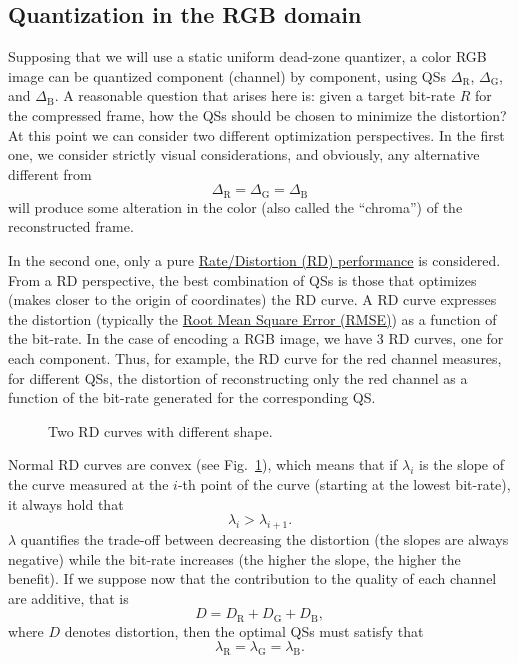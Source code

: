 \subsection{Quantization in the RGB domain}
Supposing that we will use a static uniform dead-zone quantizer, a
color RGB image can be quantized component (channel) by component,
using QSs $\Delta_{\text{R}}$, $\Delta_{\text{G}}$, and
$\Delta_{\text{B}}$. A reasonable question that arises here is: given
a target bit-rate $R$ for the compressed frame, how the QSs should be
chosen to minimize the distortion?  At this point we can consider two
different optimization perspectives. In the first one, we consider
strictly visual considerations, and obviously, any alternative
different from
\begin{equation}
  \Delta_{\text{R}} = \Delta_{\text{G}} = \Delta_{\text{B}}
  \label{eq:simple_Q}
\end{equation}
will produce some alteration in the color (also called the
``chroma'') of the reconstructed frame.

In the second one, only a pure
\href{https://en.wikipedia.org/wiki/Rate-distortion_theory}{Rate/Distortion
  (RD) performance} is considered. From a RD perspective, the best
combination of QSs is those that optimizes (makes closer to the origin
of coordinates) the RD curve. A RD curve expresses the distortion
(typically the
\href{https://en.wikipedia.org/wiki/Root-mean-square_deviation}{Root
  Mean Square Error (RMSE)}) as a function of the bit-rate. In the
case of encoding a RGB image, we have 3 RD curves, one for each
component. Thus, for example, the RD curve for the red channel measures,
for different QSs, the distortion of reconstructing only the red
channel as a function of the bit-rate generated for the corresponding
QS.

\begin{figure}
  \centering
  \caption{Two RD curves with different shape.}
  \label{fig:RD_slopes}
\end{figure}

Normal RD curves are convex (see Fig.~\ref{fig:RD_slopes}), which
means that if $\lambda_i$ is the slope of the curve measured at the
$i$-th point of the curve (starting at the lowest bit-rate), it always
hold that
\begin{equation}
  \lambda_i > \lambda_{i+1}.
\end{equation}
$\lambda$ quantifies the trade-off between decreasing the distortion
(the slopes are always negative) while the bit-rate increases (the
higher the slope, the higher the benefit). If we suppose now that the
contribution to the quality of each channel are additive, that is
\begin{equation}
  D = D_{\text{R}} + D_{\text{G}} + D_{\text{B}},
\end{equation}
where $D$ denotes distortion, then the optimal QSs must satisfy
that~\cite{vetterli1995wavelets,sayood2017introduction}
\begin{equation}
  \lambda_{\text{R}} = \lambda_{\text{G}} = \lambda_{\text{B}}.
  \label{eq:optimal_quantization}
\end{equation}

